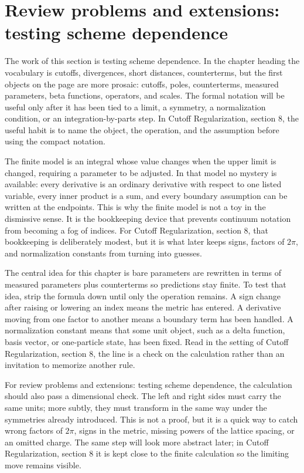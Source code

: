 \section{Review problems and extensions: testing scheme dependence}

The work of this section is testing scheme dependence.  In the chapter heading the vocabulary is cutoffs, divergences, short distances, counterterms, but the first objects on the page are more prosaic: cutoffs, poles, counterterms, measured parameters, beta functions, operators, and scales.  The formal notation will be useful only after it has been tied to a limit, a symmetry, a normalization condition, or an integration-by-parts step.  In Cutoff Regularization, section 8, the useful habit is to name the object, the operation, and the assumption before using the compact notation.

The finite model is an integral whose value changes when the upper limit is changed, requiring a parameter to be adjusted.  In that model no mystery is available: every derivative is an ordinary derivative with respect to one listed variable, every inner product is a sum, and every boundary assumption can be written at the endpoints.  This is why the finite model is not a toy in the dismissive sense.  It is the bookkeeping device that prevents continuum notation from becoming a fog of indices.  For Cutoff Regularization, section 8, that bookkeeping is deliberately modest, but it is what later keeps signs, factors of \(2\pi\), and normalization constants from turning into guesses.

The central idea for this chapter is bare parameters are rewritten in terms of measured parameters plus counterterms so predictions stay finite.  To test that idea, strip the formula down until only the operation remains.  A sign change after raising or lowering an index means the metric has entered.  A derivative moving from one factor to another means a boundary term has been handled.  A normalization constant means that some unit object, such as a delta function, basis vector, or one-particle state, has been fixed.  Read in the setting of Cutoff Regularization, section 8, the line is a check on the calculation rather than an invitation to memorize another rule.

For review problems and extensions: testing scheme dependence, the calculation should also pass a dimensional check.  The left and right sides must carry the same units; more subtly, they must transform in the same way under the symmetries already introduced.  This is not a proof, but it is a quick way to catch wrong factors of \(2\pi\), signs in the metric, missing powers of the lattice spacing, or an omitted charge.  The same step will look more abstract later; in Cutoff Regularization, section 8 it is kept close to the finite calculation so the limiting move remains visible.

